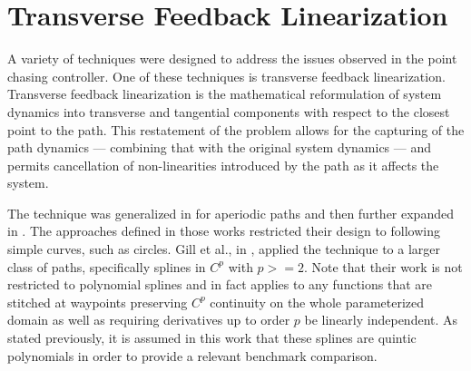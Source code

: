 \section{Transverse Feedback Linearization}
A variety of techniques were designed to address the issues observed in the point chasing controller. One of these techniques is transverse feedback linearization. Transverse feedback linearization is the mathematical reformulation of system dynamics into transverse and tangential components with respect to the closest point to the path. This restatement of the problem allows for the capturing of the path dynamics --- combining that with the original system dynamics --- and permits cancellation of non-linearities introduced by the path as it affects the system.

The technique was generalized in \cite{Nielsen06} for aperiodic paths and then further expanded in \cite{Hladio13}. The approaches defined in those works restricted their design to following simple curves, such as circles. Gill et al., in \cite{Gill15}, applied the technique to a larger class of paths, specifically splines in $C^p$ with $p>=2$. Note that their work is not restricted to polynomial splines and in fact applies to any functions that are stitched at waypoints preserving $C^p$ continuity on the whole parameterized domain as well as requiring derivatives up to order $p$ be linearly independent. As stated previously, it is assumed in this work that these splines are quintic polynomials in order to provide a relevant benchmark comparison.

